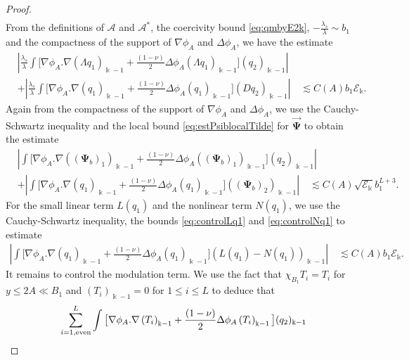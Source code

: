 \documentclass[11pt]{aims}
\theoremstyle{definition}
\numberwithin{equation}{section}
\begin{document}
\begin{proof}
\begin{align}
\end{align}
From the definitions of ${\mathscr{A}}$ and ${\mathscr{A}}^*$, the coercivity bound \eqref{eq:qmbyE2k}, $-\frac{\lambda_s}{\lambda} \sim b_1$ and the compactness of the support of $\nabla\phi_A$ and $\Delta \phi_A$, we have the estimate
\begin{align*}
&\left|\frac{\lambda_s}{\lambda} \int \big[\nabla \phi_A . \nabla \left(\Lambda q_1\right)_{\Bbbk - 1} + \frac{(1 - \nu)}{2}\Delta \phi_A \left(\Lambda q_1\right)_{\Bbbk- 1} \big](q_2)_{\Bbbk - 1}\right|\\
& +\left|\frac{\lambda_s}{\lambda}\int \big[\nabla \phi_A . \nabla (q_1)_{\Bbbk - 1} + \frac{(1 - \nu)}{2}\Delta \phi_A (q_1)_{\Bbbk- 1} \big]\left(Dq_2 \right)_{\Bbbk - 1}\right|\quad \lesssim C(A)b_1{\mathscr{E}}_\Bbbk.
\end{align*}
Again from the compactness of the support of $\nabla\phi_A$ and $\Delta \phi_A$, we use the Cauchy-Schwartz inequality and the local bound \eqref{eq:estPsiblocalTilde} for $\vec{\mathbf{\Psi}}$ to obtain the estimate
\begin{align*}
&\left|\int \big[\nabla \phi_A . \nabla \left((\mathbf{\Psi}_b)_1\right)_{\Bbbk - 1} + \frac{(1 - \nu)}{2}\Delta \phi_A \left((\mathbf{\Psi}_b)_1\right)_{\Bbbk- 1} \big](q_2)_{\Bbbk - 1}\right|\\
& +\left|\int \big[\nabla \phi_A . \nabla (q_1)_{\Bbbk - 1} + \frac{(1 - \nu)}{2}\Delta \phi_A (q_1)_{\Bbbk- 1} \big]\left((\mathbf{\Psi}_b)_2 \right)_{\Bbbk - 1}\right|\quad \lesssim C(A)\sqrt{{\mathscr{E}}_\Bbbk}b_1^{L + 3}.
\end{align*}
For the small linear term $L(q_1)$ and the nonlinear term $N(q_1)$, we use the Cauchy-Schwartz inequality, the bounds \eqref{eq:controlLq1} and \eqref{eq:controlNq1} to estimate
\begin{align*}
\left|\int \big[\nabla \phi_A . \nabla (q_1)_{\Bbbk - 1} + \frac{(1 - \nu)}{2}\Delta \phi_A (q_1)_{\Bbbk- 1} \big]\left(L(q_1) - N(q_1) \right)_{\Bbbk - 1}\right|\quad \lesssim C(A)b_1{\mathscr{E}}_\Bbbk.
\end{align*}
It remains to control the modulation term.  We use the fact that $\chi_{B_1} T_i = T_i$ for $y \leq 2A \ll B_1$ and $(T_i)_{\Bbbk - 1} = 0$ for $1 \leq i \leq L$ to deduce that 
 \begin{align*}
& \sum_{i = 1, \textup{even}}^L\int \big[\nabla \phi_A . \nabla \left(T_i\right)_{\Bbbk - 1} + \frac{(1 - \nu)}{2}\Delta \phi_A \left(T_i\right)_{\Bbbk- 1} \big](q_2)_{\Bbbk - 1} \\

\end{align*}
\end{proof}
\end{document}
